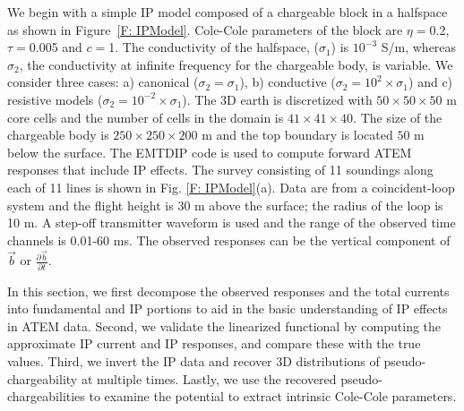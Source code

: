 \documentclass[extra,mreferee]{gji}
\renewcommand {\b}  { {\vec b} }
\begin{document}
We begin with a simple IP model composed of a chargeable block in a halfspace as shown in Figure~\ref{F: IPModel}.
Cole-Cole parameters of the block are  $\eta=$0.2, $\tau=$0.005 and $c=$1.
The conductivity  of the halfspace, ($\sigma_1$) is  $10^{-3}$ S/m, whereas $\sigma_2$, 
the conductivity at infinite frequency for the chargeable body, is variable.  
We consider three cases: a) canonical ($\sigma_2=\sigma_1$), b) conductive ($\sigma_2=10^2\times\sigma_1$) and c) resistive models ($\sigma_2=10^{-2}\times\sigma_1$).
The 3D earth is discretized with  $50\times50\times50$ m core cells and the number of cells in the domain is $41\times41\times40$.
The size of the chargeable body is $250\times250\times200$ m and the top boundary is located  $50$ m below the surface.
The EMTDIP code \cite[]{Marchant2014} is used to compute forward ATEM responses that include IP effects. The survey consisting of 11 soundings along each of 11 lines is shown in Fig. \ref{F: IPModel}(a).
Data are from a  coincident-loop system and the flight height is 30 m above the surface; the radius of the loop is 10 m.
A step-off transmitter waveform is used and the range of the observed time channels is 0.01-60 ms. The observed responses can be the vertical component of $\b$ or $\frac{\partial \b}{\partial t}$.

In this section, we first decompose the observed responses and the total currents into fundamental and IP portions to aid in the basic understanding of IP effects in ATEM data. 
Second, we validate the linearized functional by computing the approximate IP current and IP responses, and compare these  with the true values. 
Third, we invert the IP data and recover 3D distributions of pseudo-chargeability at multiple times.  Lastly, we use the recovered pseudo-chargeabilities to examine the potential to extract intrinsic Cole-Cole parameters. 


\end{document}
